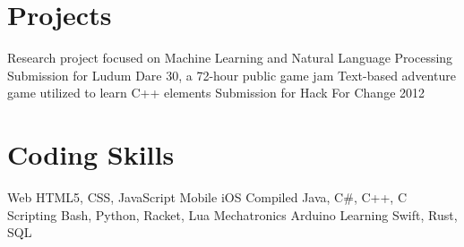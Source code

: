 \documentclass[11pt,a4paper,sans]{moderncv}        %
\begin{document}
\section{Projects}		%
			{Research project focused on Machine Learning and Natural Language Processing}
			{Submission for Ludum Dare 30, a 72-hour public game jam}
			{Text-based adventure game utilized to learn C++ elements}
	{Submission for Hack For Change 2012}

\section{Coding Skills}	%
\cvdoubleitem
{Web}	                {HTML5, CSS, JavaScript}
{Mobile}	        {iOS}
\cvdoubleitem
{Compiled}	        {Java, C\#, C++, C}
{Scripting}		{Bash, Python, Racket, Lua}
\cvdoubleitem
{Mechatronics}	        {Arduino}
{Learning}		{Swift, Rust, SQL}
\end{document}
